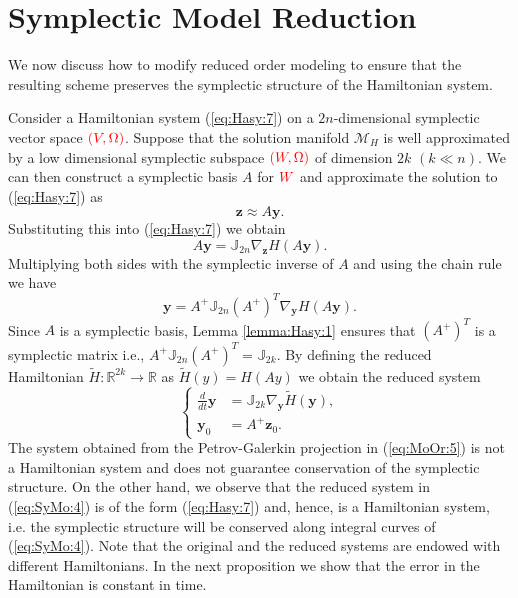 \section{Symplectic Model Reduction} \label{chap:SyMo:1}
We now {\edit discuss} how to modify reduced order modeling to ensure that {\edit the resulting scheme preserves} the symplectic structure of the Hamiltonian system. 



Consider a Hamiltonian system (\ref{eq:Hasy:7}) on a $2n$-dimensional symplectic vector space $\color{red} (V,\Omega)$. Suppose that the solution manifold $\mathcal M_H$ is well approximated by a low dimensional symplectic subspace $\color{red} (W,\Omega)$ of dimension $2k$ $(k\ll n)$. We can {\edit then} construct a symplectic basis $A$ for $\color{red} W$ and approximate the solution to (\ref{eq:Hasy:7}) as
\begin{equation} \label{eq:SyMo:1}
	\mathbf z \approx A\mathbf y.
\end{equation}
Substituting this into (\ref{eq:Hasy:7}) we obtain
\begin{equation} \label{eq:SyMo:2}
	A\mathbf y = \mathbb{J}_{2n} \nabla_{\mathbf z} H(A \mathbf y). 
\end{equation}
Multiplying both sides with the symplectic inverse of $A$ and using the chain rule we have
\begin{equation} \label{eq:SyMo:3}
	\mathbf y = A^+ \mathbb J_{2n} (A^+)^T \nabla_{\mathbf y} H(A\mathbf y).
\end{equation}
Since $A$ is a symplectic basis, Lemma \ref{lemma:Hasy:1} ensures that $(A^+)^T$ is a symplectic matrix i.e., $A^+ \mathbb J_{2n} (A^+)^T = \mathbb{J}_{2k}$. By defining the reduced Hamiltonian $\tilde H:\mathbb R^{2k} \to \mathbb R$ as $\tilde H (y) = H(Ay)$ we obtain the reduced system
\begin{equation} \label{eq:SyMo:4}
\left\{
\begin{aligned}
	 \frac{d}{dt} \mathbf y &= \mathbb J_{2k} \nabla_{\mathbf y} \tilde H(\mathbf y), \\
	 \mathbf y_0 &= A^+ \mathbf z_0.
\end{aligned}
\right.
\end{equation}
The system obtained from the Petrov-Galerkin projection in (\ref{eq:MoOr:5}) is not a Hamiltonian system and does not guarantee conservation of the symplectic structure. On the other hand, we observe that the reduced system in (\ref{eq:SyMo:4}) is of the form (\ref{eq:Hasy:7}) and, hence, is a Hamiltonian system, i.e. the symplectic structure will be conserved along integral curves of (\ref{eq:SyMo:4}). Note that the original and the reduced systems are {\edit endowed with} different Hamiltonians. In the next proposition we show that the error in the Hamiltonian is constant in time. 



